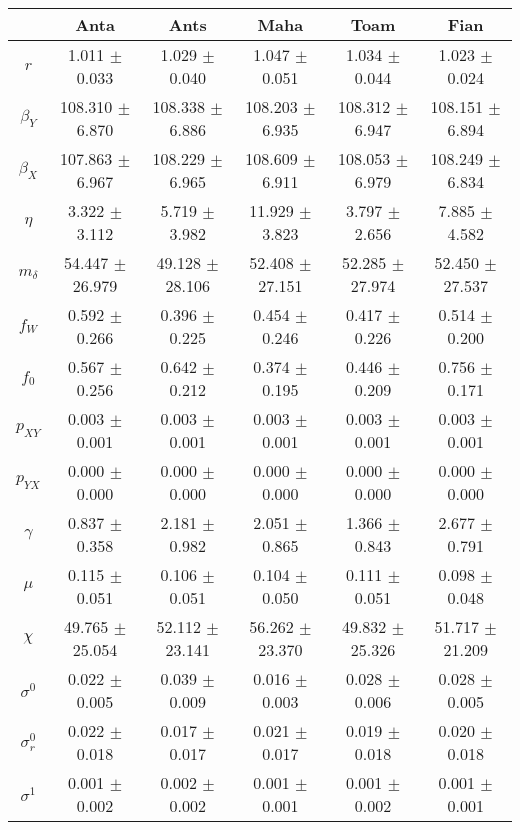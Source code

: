 \begin{sidewaystable}
\centering
\begin{tabular}{cccccc}
 & {\bf Anta} & {\bf Ants} & {\bf Maha} & {\bf Toam} & {\bf Fian} \\
\hline\hline
{\bf $r$} & 1.011 $\pm$ 0.033 & 1.029 $\pm$ 0.040 & 1.047 $\pm$ 0.051 & 1.034 $\pm$ 0.044 & 1.023 $\pm$ 0.024 \\
{\bf $\beta_Y$} & 108.310 $\pm$ 6.870 & 108.338 $\pm$ 6.886 & 108.203 $\pm$ 6.935 & 108.312 $\pm$ 6.947 & 108.151 $\pm$ 6.894 \\
{\bf $\beta_X$} & 107.863 $\pm$ 6.967 & 108.229 $\pm$ 6.965 & 108.609 $\pm$ 6.911 & 108.053 $\pm$ 6.979 & 108.249 $\pm$ 6.834 \\
{\bf $\eta$} & 3.322 $\pm$ 3.112 & 5.719 $\pm$ 3.982 & 11.929 $\pm$ 3.823 & 3.797 $\pm$ 2.656 & 7.885 $\pm$ 4.582 \\
{\bf $m_{\delta}$} & 54.447 $\pm$ 26.979 & 49.128 $\pm$ 28.106 & 52.408 $\pm$ 27.151 & 52.285 $\pm$ 27.974 & 52.450 $\pm$ 27.537 \\
{\bf $f_W$} & 0.592 $\pm$ 0.266 & 0.396 $\pm$ 0.225 & 0.454 $\pm$ 0.246 & 0.417 $\pm$ 0.226 & 0.514 $\pm$ 0.200 \\
{\bf $f_0$} & 0.567 $\pm$ 0.256 & 0.642 $\pm$ 0.212 & 0.374 $\pm$ 0.195 & 0.446 $\pm$ 0.209 & 0.756 $\pm$ 0.171 \\
{\bf $p_{XY}$} & 0.003 $\pm$ 0.001 & 0.003 $\pm$ 0.001 & 0.003 $\pm$ 0.001 & 0.003 $\pm$ 0.001 & 0.003 $\pm$ 0.001 \\
{\bf $p_{YX}$} & 0.000 $\pm$ 0.000 & 0.000 $\pm$ 0.000 & 0.000 $\pm$ 0.000 & 0.000 $\pm$ 0.000 & 0.000 $\pm$ 0.000 \\
{\bf $\gamma$} & 0.837 $\pm$ 0.358 & 2.181 $\pm$ 0.982 & 2.051 $\pm$ 0.865 & 1.366 $\pm$ 0.843 & 2.677 $\pm$ 0.791 \\
{\bf $\mu$} & 0.115 $\pm$ 0.051 & 0.106 $\pm$ 0.051 & 0.104 $\pm$ 0.050 & 0.111 $\pm$ 0.051 & 0.098 $\pm$ 0.048 \\
{\bf $\chi$} & 49.765 $\pm$ 25.054 & 52.112 $\pm$ 23.141 & 56.262 $\pm$ 23.370 & 49.832 $\pm$ 25.326 & 51.717 $\pm$ 21.209 \\
{\bf $\sigma^0$} & 0.022 $\pm$ 0.005 & 0.039 $\pm$ 0.009 & 0.016 $\pm$ 0.003 & 0.028 $\pm$ 0.006 & 0.028 $\pm$ 0.005 \\
{\bf $\sigma^0_r$} & 0.022 $\pm$ 0.018 & 0.017 $\pm$ 0.017 & 0.021 $\pm$ 0.017 & 0.019 $\pm$ 0.018 & 0.020 $\pm$ 0.018 \\
{\bf $\sigma^1$} & 0.001 $\pm$ 0.002 & 0.002 $\pm$ 0.002 & 0.001 $\pm$ 0.001 & 0.001 $\pm$ 0.002 & 0.001 $\pm$ 0.001 \\

\end{tabular}
\end{sidewaystable}
